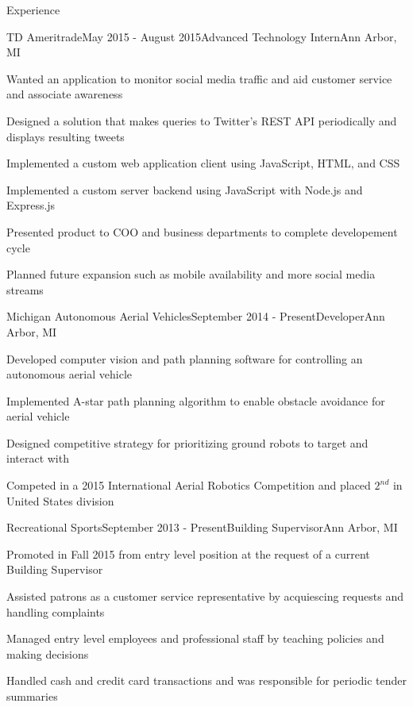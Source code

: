 \documentclass{resume} %
\begin{document}
\begin{rSection}{Experience}

\begin{rSubsection}{TD Ameritrade}{May 2015 - August 2015}{Advanced Technology Intern}{Ann Arbor, MI}
    \item Wanted an application to monitor social media traffic and aid customer service and associate awareness
    \item Designed a solution that makes queries to Twitter's REST API periodically and displays resulting tweets
    \item Implemented a custom web application client using JavaScript, HTML, and CSS
    \item Implemented a custom server backend using JavaScript with Node.js and Express.js
    \item Presented product to COO and business departments to complete developement cycle
    \item Planned future expansion such as mobile availability and more social media streams
\end{rSubsection}


\begin{rSubsection}{Michigan Autonomous Aerial Vehicles}{September 2014 - Present}{Developer}{Ann Arbor, MI}
    \item Developed computer vision and path planning software for controlling an autonomous aerial vehicle
    \item Implemented A-star path planning algorithm to enable obstacle avoidance for aerial vehicle
    \item Designed competitive strategy for prioritizing ground robots to target and interact with
    \item Competed in a 2015 International Aerial Robotics Competition and placed $2^{nd}$ in United States division
\end{rSubsection}


\begin{rSubsection}{Recreational Sports}{September 2013 - Present}{Building Supervisor}{Ann Arbor, MI}
    \item Promoted in Fall 2015 from entry level position at the request of a current Building Supervisor
    \item Assisted patrons as a customer service representative by acquiescing requests and handling complaints
    \item Managed entry level employees and professional staff by teaching policies and making decisions
    \item Handled cash and credit card transactions and was responsible for periodic tender summaries
\end{rSubsection}

\end{rSection}
\end{document}

